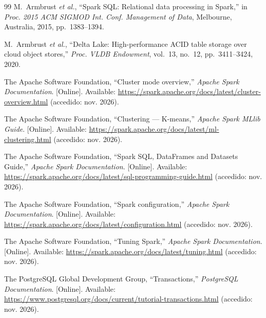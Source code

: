 \documentclass[conference,a4paper]{IEEEtran}
\begin{document}
\begin{thebibliography}{99}
M.~Armbrust \textit{et al.}, ``Spark SQL: Relational data processing in Spark,'' in \textit{Proc. 2015 ACM SIGMOD Int. Conf. Management of Data}, Melbourne, Australia, 2015, pp.~1383--1394.

M.~Armbrust \textit{et al.}, ``Delta Lake: High-performance ACID table storage over cloud object stores,'' \textit{Proc. VLDB Endowment}, vol.~13, no.~12, pp.~3411--3424, 2020.

The Apache Software Foundation, ``Cluster mode overview,'' \textit{Apache Spark Documentation}. [Online]. Available: \url{https://spark.apache.org/docs/latest/cluster-overview.html} (accedido: nov. 2026).

The Apache Software Foundation, ``Clustering --- K-means,'' \textit{Apache Spark MLlib Guide}. [Online]. Available: \url{https://spark.apache.org/docs/latest/ml-clustering.html} (accedido: nov. 2026).

The Apache Software Foundation, ``Spark SQL, DataFrames and Datasets Guide,'' \textit{Apache Spark Documentation}. [Online]. Available: \url{https://spark.apache.org/docs/latest/sql-programming-guide.html} (accedido: nov. 2026).

The Apache Software Foundation, ``Spark configuration,'' \textit{Apache Spark Documentation}. [Online]. Available: \url{https://spark.apache.org/docs/latest/configuration.html} (accedido: nov. 2026).

The Apache Software Foundation, ``Tuning Spark,'' \textit{Apache Spark Documentation}. [Online]. Available: \url{https://spark.apache.org/docs/latest/tuning.html} (accedido: nov. 2026).

The PostgreSQL Global Development Group, ``Transactions,'' \textit{PostgreSQL Documentation}. [Online]. Available: \url{https://www.postgresql.org/docs/current/tutorial-transactions.html} (accedido: nov. 2026).

\end{thebibliography}
\end{document}

